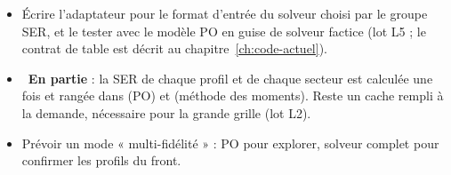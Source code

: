 \begin{pistes}
\begin{itemize}
\item Écrire l'adaptateur pour le format d'entrée du solveur choisi par le groupe SER, et le tester avec le modèle PO en guise de solveur factice (lot L5 ; le contrat de table est décrit au chapitre~\ref{ch:code-actuel}).
\item {}~\textbf{En partie} : la SER de chaque profil et de chaque secteur est calculée une fois et rangée dans  (PO) et  (méthode des moments). Reste un cache rempli à la demande, nécessaire pour la grande grille (lot L2).
\item Prévoir un mode « multi-fidélité » : PO pour explorer, solveur complet pour confirmer les profils du front.
\end{itemize}
\end{pistes}
